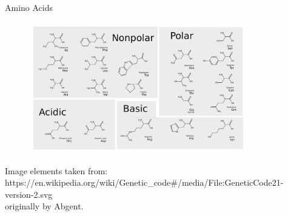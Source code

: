 \documentclass[pdf]{beamer}
\begin{document}
\begin{frame}{Amino Acids}
  \begin{figure}[ht]
    \includegraphics[width=0.85\textwidth]{images/Amino_Acids}
  \end{figure}
  {\tiny
    Image elements taken from:\\
    https://en.wikipedia.org/wiki/Genetic\_code\#/media/File:GeneticCode21-version-2.svg\\
    originally by Abgent.
    \par
  }
\end{frame}
\end{document}

